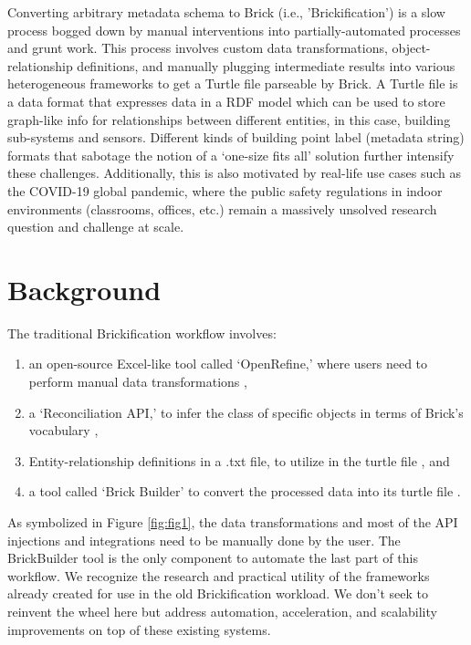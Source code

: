 \documentclass[twocolumn, switch]{article} %
\begin{document}
Converting arbitrary metadata schema to Brick (i.e., 'Brickification') is a
slow process bogged down by manual interventions into partially-automated
processes and grunt work. This process involves custom data transformations,
object-relationship definitions, and manually plugging intermediate results
into various heterogeneous frameworks to get a Turtle file parseable by Brick.
A Turtle file is a data format that expresses data in a RDF model which can be used to store graph-like info for
relationships between different entities, in this case, building sub-systems and
sensors. Different kinds of building point label (metadata string) formats that sabotage the notion of a ‘one-size fits all’ solution further intensify these challenges.  Additionally, this is also motivated by real-life use cases such as the COVID-19 global pandemic, where the public safety regulations in indoor environments (classrooms, offices, etc.) remain a massively unsolved research question and challenge at scale.


\section{Background}

The traditional Brickification workflow involves:
\begin{enumerate}
    \item an open-source Excel-like tool called ‘OpenRefine,’ where users need
        to perform manual data transformations
        \cite{gtfierro225_2020},
    \item a ‘Reconciliation API,’ to infer the class of specific objects in
        terms of Brick’s vocabulary \cite{brickschema},
    \item Entity-relationship definitions in a .txt file, to utilize in the
        turtle file \cite{gtfierro}, and
    \item a tool called ‘Brick Builder’ to convert the processed data into its
        turtle file \cite{brick_ttl_viewer}.
\end{enumerate}
As symbolized in Figure \ref{fig:fig1}, the data transformations and most of the API injections and integrations need to be manually done by the user. The BrickBuilder tool is the only component to automate the last part of this workflow. We recognize the research and practical utility of the frameworks already created for use in the old Brickification workload. We don’t seek to reinvent the wheel here but address automation, acceleration, and scalability improvements on top of these existing systems.
\end{document}
